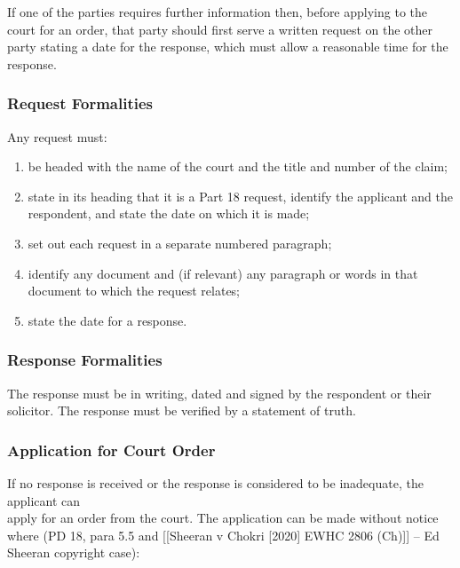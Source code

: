 \documentclass[
]{article}
\providecommand{\tightlist}{%
  \setlength{\itemsep}{0pt}\setlength{\parskip}{0pt}}
\begin{document}
If one of the parties requires further information then, before applying
to the court for an order, that party should first serve a written
request on the other party stating a date for the response, which must
allow a reasonable time for the response.

\hypertarget{request-formalities}{%
\subsubsection{Request Formalities}\label{request-formalities}}

Any request must:

\begin{enumerate}
\def\labelenumi{\arabic{enumi}.}
\tightlist
\item
  be headed with the name of the court and the title and number of the
  claim;
\item
  state in its heading that it is a Part 18 request, identify the
  applicant and the respondent, and state the date on which it is made;
\item
  set out each request in a separate numbered paragraph;
\item
  identify any document and (if relevant) any paragraph or words in that
  document to which the request relates;
\item
  state the date for a response.
\end{enumerate}

\hypertarget{response-formalities}{%
\subsubsection{Response Formalities}\label{response-formalities}}

The response must be in writing, dated and signed by the respondent or
their solicitor. The response must be verified by a statement of truth.

\hypertarget{application-for-court-order}{%
\subsubsection{Application for Court
Order}\label{application-for-court-order}}

If no response is received or the response is considered to be
inadequate, the applicant can\\
apply for an order from the court. The application can be made without
notice where (PD 18, para 5.5 and {[}{[}Sheeran v Chokri {[}2020{]} EWHC
2806 (Ch){]}{]} -- Ed Sheeran copyright case):
\end{document}
